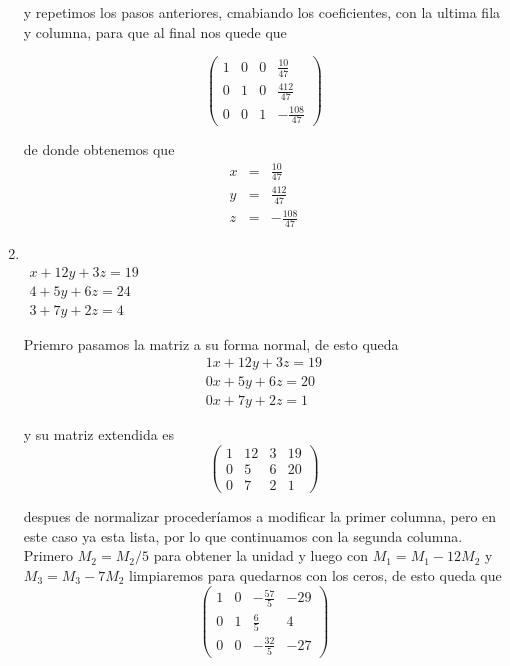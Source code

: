 \documentclass[11pt]{article}
\begin{document}
\begin{multicols}{2}
\begin{enumerate}[\bf{Sistema} 1]
			y repetimos los pasos anteriores, cmabiando los coeficientes, con la ultima fila y columna, para que al final nos quede que
			
			$$\left(\begin{array}{rrrr}
				1 & 0 & 0 & \frac{10}{47} \\
				0 & 1 & 0 & \frac{412}{47} \\
				0 & 0 & 1 & -\frac{108}{47}
			\end{array}\right)$$
			
			de donde obtenemos que		
			\begin{eqnarray*}
				x &=& \frac{10}{47} \\
				y &=& \frac{412}{47} \\
				z &=&-\frac{108}{47}
			\end{eqnarray*}			


		\item
			\ \\ $\begin{matrix}
				x + 12y + 3z = 19 \\
				4 +  5y + 6z = 24 \\
				3 +  7y + 2z = 4
			\end{matrix}$

			\par Priemro pasamos la matriz a su forma normal, de esto queda
			$$\begin{matrix}
				1x + 12y + 3z = 19 \\
				0x +  5y + 6z = 20 \\
				0x +  7y + 2z = 1
			\end{matrix}$$
			
			y su matriz extendida es			
			$$\left(\begin{array}{rrrr}
				1 & 12 & 3 & 19 \\
				0 & 5 & 6 & 20 \\
				0 & 7 & 2 & 1
			\end{array}\right)$$
			
			despues de normalizar proceder\'iamos a modificar la primer columna, pero en este caso ya esta lista, por lo que continuamos con la segunda columna. Primero $M_2 = M_2/5$ para obtener la unidad y luego con $M_1 = M_1 - 12 M_2$ y $M_3 = M_3 - 7 M_2$ limpiaremos para quedarnos con los ceros, de esto queda que 
			$$\left(\begin{array}{rrrr}
				1 & 0 & -\frac{57}{5} & -29 \\
				0 & 1 & \frac{6}{5} & 4 \\
				0 & 0 & -\frac{32}{5} & -27
			\end{array}\right)$$
			

\end{enumerate}
\end{multicols}
\end{document}
